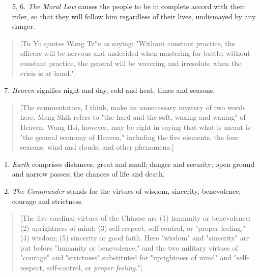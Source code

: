 \documentclass[10pt,a4paper]{book}
\begin{document}
\begin{enumerate}[leftmargin=*, label=\arabic*., wide=0pt, resume]
\item[5, 6.] \textit{The Moral Law} causes the people to be in complete accord with their ruler, so that they will follow him regardless of their lives, undismayed by any danger.
\end{enumerate}

{\small
\begin{quote}
[Tu Yu quotes Wang Tz"u as saying: "Without constant practice, the officers will be nervous and undecided when mustering for battle; without constant practice, the general will be wavering and irresolute when the crisis is at hand."]
\end{quote}
}

\begin{enumerate}[leftmargin=*, label=\arabic*., wide=0pt, resume]
\setcounter{enumi}{6}
\item \textit{Heaven} signifies night and day, cold and heat, times and seasons.
\end{enumerate}

{\small
\begin{quote}
[The commentators, I think, make an unnecessary mystery of two words here. Meng Shih refers to "the hard and the soft, waxing and waning" of Heaven. Wang Hsi, however, may be right in saying that what is meant is "the general economy of Heaven," including the five elements, the four seasons, wind and clouds, and other phenomena.]
\end{quote}
}

\begin{enumerate}[leftmargin=*, label=\arabic*., wide=0pt, resume]

\item \textit{Earth} comprises distances, great and small; danger and security; open ground and narrow passes; the chances of life and death.

\item \textit{The Commander} stands for the virtues of wisdom, sincerity, benevolence, courage and strictness.

\end{enumerate}

{\small
\begin{quote}
[The five cardinal virtues of the Chinese are (1) humanity or benevolence; (2) uprightness of mind; (3) self-respect, self-control, or "proper feeling;" (4) wisdom; (5) sincerity or good faith. Here "wisdom" and "sincerity" are put before "humanity or benevolence," and the two military virtues of "courage" and "strictness" substituted for "uprightness of mind" and "self-respect, self-control, or \textit{proper feeling}."]
\end{quote}
}
\end{document}
